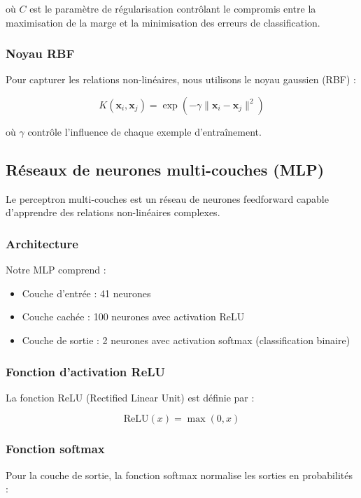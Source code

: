 où $C$ est le paramètre de régularisation contrôlant le compromis entre la maximisation de la marge et la minimisation des erreurs de classification.

\subsubsection{Noyau RBF}
Pour capturer les relations non-linéaires, nous utilisons le noyau gaussien (RBF) :

\begin{equation}
    K(\mathbf{x}_i, \mathbf{x}_j) = \exp\left(-\gamma\|\mathbf{x}_i - \mathbf{x}_j\|^2\right)
\end{equation}

où $\gamma$ contrôle l'influence de chaque exemple d'entraînement.

\subsection{Réseaux de neurones multi-couches (MLP)}

Le perceptron multi-couches est un réseau de neurones feedforward capable d'apprendre des relations non-linéaires complexes.

\subsubsection{Architecture}
Notre MLP comprend :
\begin{itemize}
    \item Couche d'entrée : 41 neurones
    \item Couche cachée : 100 neurones avec activation ReLU
    \item Couche de sortie : 2 neurones avec activation softmax (classification binaire)
\end{itemize}

\subsubsection{Fonction d'activation ReLU}
La fonction ReLU (Rectified Linear Unit) est définie par :

\begin{equation}
    \text{ReLU}(x) = \max(0, x)
\end{equation}

\subsubsection{Fonction softmax}
Pour la couche de sortie, la fonction softmax normalise les sorties en probabilités :

